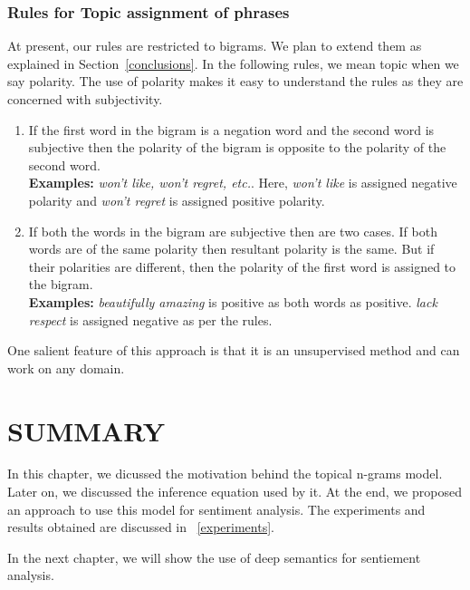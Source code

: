 \subsubsection*{Rules for Topic assignment of phrases}

At present, our rules are restricted to bigrams. We plan to extend them as explained in Section~\cref{conclusions}.
In the following rules, we mean topic when we say polarity. The use of polarity makes it easy to understand
the rules as they are concerned with subjectivity.

\begin{enumerate}
 \itemsep0em
 \item If the first word in the bigram is a negation word and the second word is subjective then the polarity
 of the bigram is opposite to the polarity of the second word. \\
 \textbf{Examples:} \textit{won't like, won't regret, etc.}. Here, \textit{won't like} is assigned negative
 polarity and \textit{won't regret} is assigned positive polarity.
 \item If both the words in the bigram are subjective then are two cases. If both words are of the same polarity
 then resultant polarity is the same. But if their polarities are different, then the polarity of the first word
 is assigned to the bigram. \\
 \textbf{Examples:} \textit{beautifully amazing} is positive as both words as positive. \textit{lack respect} is
 assigned negative as per the rules.
\end{enumerate}

One salient feature of this approach is that it is an unsupervised method and can work on any domain. 

\section*{SUMMARY}

In this chapter, we dicussed the motivation behind the topical n-grams model. Later on, we discussed the inference equation used by it. At the end,
we proposed an approach to use this model for sentiment analysis. The experiments and results obtained are discussed in ~\cref{experiments}.

In the next chapter, we will show the use of deep semantics for sentiement analysis.